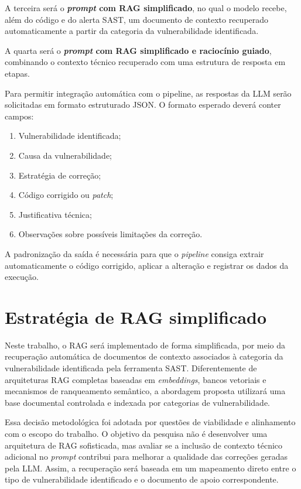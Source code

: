 A terceira será o \textbf{\textit{prompt} com RAG simplificado}, no qual o modelo recebe, além do código e do alerta SAST, um documento de contexto recuperado automaticamente a partir da categoria da vulnerabilidade identificada.

A quarta será o \textbf{\textit{prompt} com RAG simplificado e raciocínio guiado}, combinando o contexto técnico recuperado com uma estrutura de resposta em etapas.

Para permitir integração automática com o pipeline, as respostas da LLM serão solicitadas em formato estruturado JSON. O formato esperado deverá conter campos:

\begin{enumerate}
    \item Vulnerabilidade identificada;
    \item Causa da vulnerabilidade;
    \item Estratégia de correção;
    \item Código corrigido ou \textit{patch};
    \item Justificativa técnica;
    \item Observações sobre possíveis limitações da correção.
\end{enumerate}

A padronização da saída é necessária para que o \textit{pipeline} consiga extrair automaticamente o código corrigido, aplicar a alteração e registrar os dados da execução.




\section{Estratégia de RAG simplificado}

Neste trabalho, o RAG será implementado de forma simplificada, por meio da recuperação automática de documentos de contexto associados à categoria da vulnerabilidade identificada pela ferramenta SAST. Diferentemente de arquiteturas RAG completas baseadas em \textit{embeddings}, bancos vetoriais e mecanismos de ranqueamento semântico, a abordagem proposta utilizará uma base documental controlada e indexada por categorias de vulnerabilidade.

Essa decisão metodológica foi adotada por questões de viabilidade e alinhamento com o escopo do trabalho. O objetivo da pesquisa não é desenvolver uma arquitetura de RAG sofisticada, mas avaliar se a inclusão de contexto técnico adicional no \textit{prompt} contribui para melhorar a qualidade das correções geradas pela LLM. Assim, a recuperação será baseada em um mapeamento direto entre o tipo de vulnerabilidade identificado e o documento de apoio correspondente.

